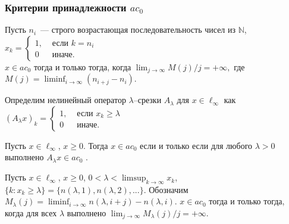 \begin{varwidth}[v]{0.455\linewidth}
	\frametitle{Критерии принадлежности $ac_0$~\cite{avdeev2019space}}


	\begin{lemma}
		Пусть $n_i$~--- строго возрастающая последовательность чисел из $\mathbb{N}$,
		$\displaystyle
			x_k = \left\{\begin{array}{ll}
				1, & \mbox{~если~} k = n_i
				\\
				0  & \mbox{~иначе.~}
			\end{array}\right.
		$
		\\
		$x\in ac_0$
		тогда и только тогда, когда
		$\displaystyle
			\lim_{j \to \infty} {M(j)}/{j} = +\infty
			,
		$
		где
		$\displaystyle
			M(j) = \liminf_{i\to\infty} (n_{i+j} - n_i)
			.
		$
	\end{lemma}


	\vspace{1.2em}
	Определим нелинейный оператор $\lambda$--срезки $A_\lambda$
	для $x\in\ell_\infty$ как
	$\displaystyle
		(A_\lambda x)_k = \begin{cases}
			1, & \mbox{~если~} x_k \geq \lambda
			\\
			0  & \mbox{~иначе.~}
		\end{cases}
	$

	\vspace{0.5em}
	\begin{theorem}
		\label{thm:lambda_prelim}
		Пусть $x\in\ell_\infty$, $x\geq 0$.
		Тогда
		$
			x\in ac_0
		$
		если и только если
		для любого $\lambda > 0$
		выполнено
		$
			A_\lambda x \in ac_0
		$
		.
	\end{theorem}
	\begin{theorem}
		Пусть $x\in\ell_\infty$, $x \geq 0$,
		$\displaystyle
			0<\lambda < \limsup_{k\to\infty} x_k
		$,
		$\{k: x_k \geq \lambda \} = \{n(\lambda,1),n(\lambda,2),...\}$.
		Обозначим
		$\displaystyle
			M_{\lambda}(j) = \liminf_{i\to\infty} n(\lambda,i+j) - n(\lambda,i)
			.
		$
		$x\in ac_0$ тогда и только тогда, когда
		для всех $\lambda$ выполнено
		$\displaystyle
			\lim_{j \to \infty} {M_{\lambda}(j)}/{j} = +\infty
			.
		$
	\end{theorem}
\end{varwidth}
